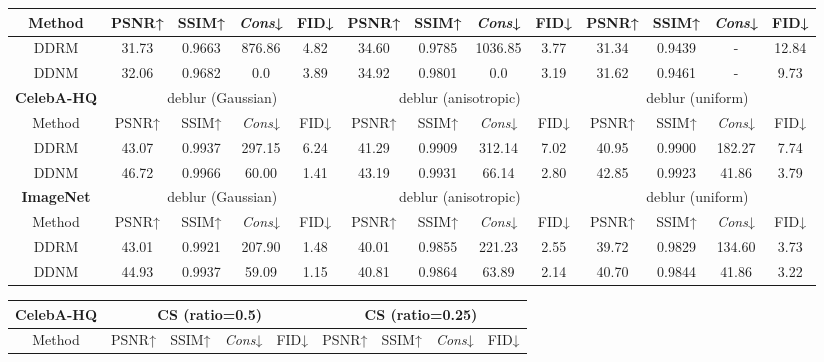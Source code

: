 \documentclass{article} \usepackage{iclr2023_conference,times}
\begin{document}
\begin{table*}[h]
\begin{tabular}{c | cccc | cccc| cccc}
        \hline
           \rule{0pt}{10pt}Method& PSNR↑&SSIM↑& \textit{Cons}↓&FID↓ &  PSNR↑&SSIM↑&  \textit{Cons}↓ &FID↓ &  PSNR↑&SSIM↑& \textit{Cons}↓&FID↓ \\
        \hline
            \rule{0pt}{10pt}{DDRM} &31.73&0.9663&876.86&4.82 & 34.60&0.9785&1036.85&3.77 & 31.34&0.9439&-&12.84\\
            \rule{0pt}{10pt}{DDNM} &32.06&0.9682&0.0&3.89 & 34.92&0.9801&0.0&3.19 & 31.62&0.9461&-&9.73\\
        \hline
        \hline
           \multicolumn{1}{c}{\rule{0pt}{10pt}\tiny\textbf{CelebA-HQ}}&\multicolumn{4}{c}{deblur (Gaussian)} &\multicolumn{4}{c}{deblur (anisotropic)}&\multicolumn{4}{c}{deblur (uniform)}\\
        \hline
           \rule{0pt}{10pt}Method& PSNR↑&SSIM↑& \textit{Cons}↓&FID↓ &  PSNR↑&SSIM↑&  \textit{Cons}↓ &FID↓ &  PSNR↑&SSIM↑& \textit{Cons}↓&FID↓ \\
        \hline
            \rule{0pt}{10pt}{DDRM} &43.07&0.9937&297.15&6.24&41.29&0.9909&312.14&7.02&40.95&0.9900&182.27&7.74\\
            \rule{0pt}{10pt}{DDNM} &46.72&0.9966&60.00&1.41 & 43.19&0.9931&66.14&2.80 & 42.85&0.9923&41.86&3.79\\
        \hline
        \hline
           \multicolumn{1}{c}{\rule{0pt}{10pt}\tiny\textbf{ImageNet}}&\multicolumn{4}{c}{deblur (Gaussian)} &\multicolumn{4}{c}{deblur (anisotropic)}&\multicolumn{4}{c}{deblur (uniform)}\\
        \hline
           \rule{0pt}{10pt}Method& PSNR↑&SSIM↑& \textit{Cons}↓&FID↓ &  PSNR↑&SSIM↑&  \textit{Cons}↓ &FID↓ &  PSNR↑&SSIM↑& \textit{Cons}↓&FID↓ \\
        \hline
            \rule{0pt}{10pt}{DDRM} &43.01&0.9921&207.90&1.48 & 40.01&0.9855&221.23&2.55 & 39.72&0.9829&134.60&3.73\\
            \rule{0pt}{10pt}{DDNM} & 44.93&0.9937&59.09&1.15 & 40.81&0.9864&63.89&2.14 & 40.70&0.9844&41.86&3.22\\
        \hline
    \end{tabular}
    \begin{tabular}{c | cccc | cccc}
    \hline
           \multicolumn{1}{c}{\rule{0pt}{10pt}\tiny\textbf{CelebA-HQ}}&\multicolumn{4}{c}{CS (ratio=0.5)} &\multicolumn{4}{c}{CS (ratio=0.25)}\\
        \hline
           \rule{0pt}{10pt}Method& PSNR↑&SSIM↑& \textit{Cons}↓&FID↓ &  PSNR↑&SSIM↑&  \textit{Cons}↓ &FID↓ \\
        \hline

\end{tabular}
\end{table*}
\end{document}
